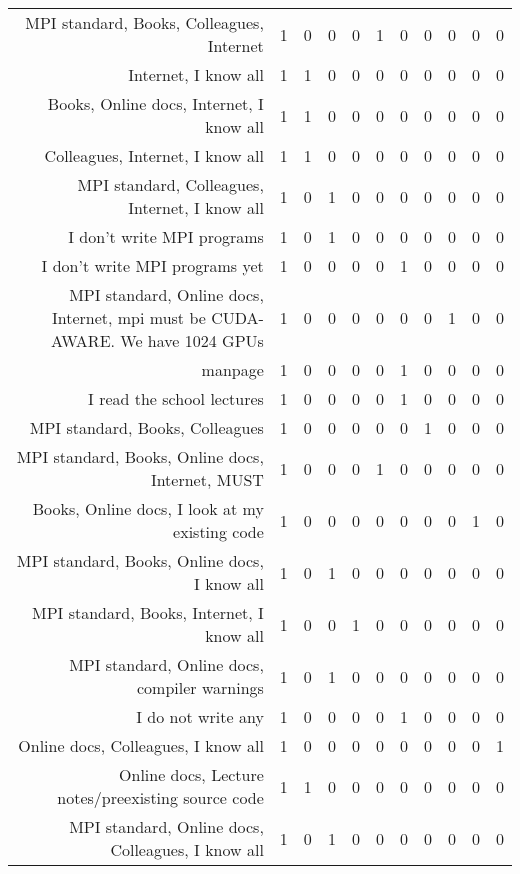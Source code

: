 {\begin{landscape}
\begin{longtable}[htb]{r|c|c|c|c|c|c|c|c|c|c}
{MPI standard, Books, Colleagues, Internet} & 1 & 0 & 0 & 0 & 1 & 0 & 0 & 0 & 0 & 0 \\%
{Internet, I know all} & 1 & 1 & 0 & 0 & 0 & 0 & 0 & 0 & 0 & 0 \\%
{Books, Online docs, Internet, I know all} & 1 & 1 & 0 & 0 & 0 & 0 & 0 & 0 & 0 & 0 \\%
{Colleagues, Internet, I know all} & 1 & 1 & 0 & 0 & 0 & 0 & 0 & 0 & 0 & 0 \\%
{MPI standard, Colleagues, Internet, I know all} & 1 & 0 & 1 & 0 & 0 & 0 & 0 & 0 & 0 & 0 \\%
{I don't write MPI programs} & 1 & 0 & 1 & 0 & 0 & 0 & 0 & 0 & 0 & 0 \\%
{I don't write MPI programs yet} & 1 & 0 & 0 & 0 & 0 & 1 & 0 & 0 & 0 & 0 \\%
{MPI standard, Online docs, Internet, mpi must be CUDA-AWARE. We have 1024 GPUs} & 1 & 0 & 0 & 0 & 0 & 0 & 0 & 1 & 0 & 0 \\%
{manpage} & 1 & 0 & 0 & 0 & 0 & 1 & 0 & 0 & 0 & 0 \\%
{I read the school lectures} & 1 & 0 & 0 & 0 & 0 & 1 & 0 & 0 & 0 & 0 \\%
{MPI standard, Books, Colleagues} & 1 & 0 & 0 & 0 & 0 & 0 & 1 & 0 & 0 & 0 \\%
{MPI standard, Books, Online docs, Internet, MUST} & 1 & 0 & 0 & 0 & 1 & 0 & 0 & 0 & 0 & 0 \\%
{Books, Online docs, I look at my existing code} & 1 & 0 & 0 & 0 & 0 & 0 & 0 & 0 & 1 & 0 \\%
{MPI standard, Books, Online docs, I know all} & 1 & 0 & 1 & 0 & 0 & 0 & 0 & 0 & 0 & 0 \\%
{MPI standard, Books, Internet, I know all} & 1 & 0 & 0 & 1 & 0 & 0 & 0 & 0 & 0 & 0 \\%
{MPI standard, Online docs, compiler warnings} & 1 & 0 & 1 & 0 & 0 & 0 & 0 & 0 & 0 & 0 \\%
{I do not write any} & 1 & 0 & 0 & 0 & 0 & 1 & 0 & 0 & 0 & 0 \\%
{Online docs, Colleagues, I know all} & 1 & 0 & 0 & 0 & 0 & 0 & 0 & 0 & 0 & 1 \\%
{Online docs, Lecture notes/preexisting source code} & 1 & 1 & 0 & 0 & 0 & 0 & 0 & 0 & 0 & 0 \\%
{MPI standard, Online docs, Colleagues, I know all} & 1 & 0 & 1 & 0 & 0 & 0 & 0 & 0 & 0 & 0 \\%
\hline%
\end{longtable}%
\end{landscape}}%
\clearpage%
